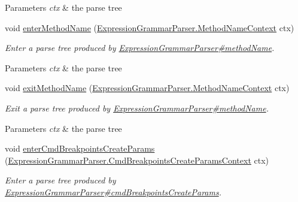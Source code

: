 \begin{DoxyCompactItemize}
\begin{DoxyCompactList}
\begin{DoxyParams}{Parameters}
{\em ctx} & the parse tree\\
\hline
\end{DoxyParams}
 \end{DoxyCompactList}\item 
void \hyperlink{classgov_1_1nasa_1_1jpf_1_1inspector_1_1server_1_1expression_1_1parser_1_1_expression_grammar_base_listener_a604ea44830cfc0213a16ef9dc5d7175f}{enter\+Method\+Name} (\hyperlink{classgov_1_1nasa_1_1jpf_1_1inspector_1_1server_1_1expression_1_1parser_1_1_expression_grammar_parser_1_1_method_name_context}{Expression\+Grammar\+Parser.\+Method\+Name\+Context} ctx)
\begin{DoxyCompactList}\small\item\em Enter a parse tree produced by \hyperlink{classgov_1_1nasa_1_1jpf_1_1inspector_1_1server_1_1expression_1_1parser_1_1_expression_grammar_parser_aac9184fdab918306e0886559ac17f396}{Expression\+Grammar\+Parser\#method\+Name}.


\begin{DoxyParams}{Parameters}
{\em ctx} & the parse tree\\
\hline
\end{DoxyParams}
 \end{DoxyCompactList}\item 
void \hyperlink{classgov_1_1nasa_1_1jpf_1_1inspector_1_1server_1_1expression_1_1parser_1_1_expression_grammar_base_listener_ad054dfe4bfd14a7c50bb199544e3139b}{exit\+Method\+Name} (\hyperlink{classgov_1_1nasa_1_1jpf_1_1inspector_1_1server_1_1expression_1_1parser_1_1_expression_grammar_parser_1_1_method_name_context}{Expression\+Grammar\+Parser.\+Method\+Name\+Context} ctx)
\begin{DoxyCompactList}\small\item\em Exit a parse tree produced by \hyperlink{classgov_1_1nasa_1_1jpf_1_1inspector_1_1server_1_1expression_1_1parser_1_1_expression_grammar_parser_aac9184fdab918306e0886559ac17f396}{Expression\+Grammar\+Parser\#method\+Name}.


\begin{DoxyParams}{Parameters}
{\em ctx} & the parse tree\\
\hline
\end{DoxyParams}
 \end{DoxyCompactList}\item 
void \hyperlink{classgov_1_1nasa_1_1jpf_1_1inspector_1_1server_1_1expression_1_1parser_1_1_expression_grammar_base_listener_a09b81f4db7b71b2820947e24ea7a4a97}{enter\+Cmd\+Breakpoints\+Create\+Params} (\hyperlink{classgov_1_1nasa_1_1jpf_1_1inspector_1_1server_1_1expression_1_1parser_1_1_expression_grammar_pa40092569cc5b197b7a5caae27da04e05}{Expression\+Grammar\+Parser.\+Cmd\+Breakpoints\+Create\+Params\+Context} ctx)
\begin{DoxyCompactList}\small\item\em Enter a parse tree produced by \hyperlink{classgov_1_1nasa_1_1jpf_1_1inspector_1_1server_1_1expression_1_1parser_1_1_expression_grammar_parser_af2721b9a2421fbe474ff8614c667be8b}{Expression\+Grammar\+Parser\#cmd\+Breakpoints\+Create\+Params}.



\end{DoxyCompactList}
\end{DoxyCompactItemize}

